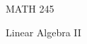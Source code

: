 \documentclass[11pt, oneside, titlepage]{book}
\begin{document}
    \begin{titlepage}
    \centering
    \vspace*{8.5cm}
    {\serifastd\huge MATH 245 \par}
    \vspace{1cm}
    {\serifastd\Large Linear Algebra II \par}
    \algebraicon
    \vspace*{\fill}
    \cleardoublepage
    \end{titlepage} 

    \toc

    
    
    
    
    
\end{document}
